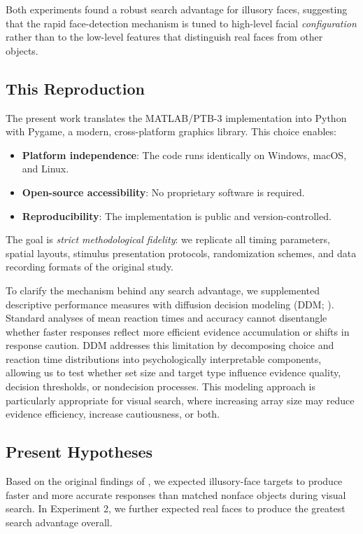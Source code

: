 \documentclass[stu,12pt,floatsintext]{apa7}
\begin{document}
Both experiments found a robust search advantage for illusory faces, suggesting that the rapid face-detection mechanism is tuned to high-level facial \textit{configuration} rather than to the low-level features that distinguish real faces from other objects.

\subsection{This Reproduction}

The present work translates the MATLAB/PTB-3 implementation into Python with Pygame, a modern, cross-platform graphics library. This choice enables:

\begin{itemize}
    \item \textbf{Platform independence}: The code runs identically on Windows, macOS, and Linux.
    \item \textbf{Open-source accessibility}: No proprietary software is required.
    \item \textbf{Reproducibility}: The implementation is public and version-controlled.
\end{itemize}

The goal is \textit{strict methodological fidelity}: we replicate all timing parameters, spatial layouts, stimulus presentation protocols, randomization schemes, and data recording formats of the original study.

To clarify the mechanism behind any search advantage, we supplemented descriptive performance measures with diffusion decision modeling (DDM; \textcite{Ratcliff2008}). Standard analyses of mean reaction times and accuracy cannot disentangle whether faster responses reflect more efficient evidence accumulation or shifts in response caution. DDM addresses this limitation by decomposing choice and reaction time distributions into psychologically interpretable components, allowing us to test whether set size and target type influence evidence quality, decision thresholds, or nondecision processes. This modeling approach is particularly appropriate for visual search, where increasing array size may reduce evidence efficiency, increase cautiousness, or both.


\subsection{Present Hypotheses}

Based on the original findings of \textcite{Keys2021}, we expected illusory-face targets to produce faster and more accurate responses than matched nonface objects during visual search. In Experiment 2, we further expected real faces to produce the greatest search advantage overall.
\end{document}
